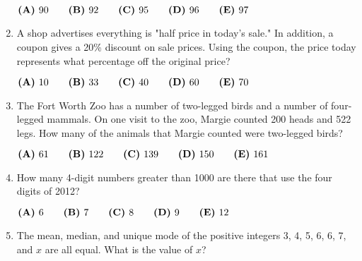 \documentclass{article}
\begin{document}
\begin{enumerate}[label=\arabic*., itemsep=0.5em]
\( \textbf{(A)}\hspace{.05in}90\qquad\textbf{(B)}\hspace{.05in}92\qquad\textbf{(C)}\hspace{.05in}95\qquad\textbf{(D)}\hspace{.05in}96\qquad\textbf{(E)}\hspace{.05in}97 \)\par \vspace{0.5em}\item A shop advertises everything is "half price in today's sale." In addition, a coupon gives a 20\% discount on sale prices. Using the coupon, the price today represents what percentage off the original price?

\( \textbf{(A)}\hspace{.05in}10\qquad\textbf{(B)}\hspace{.05in}33\qquad\textbf{(C)}\hspace{.05in}40\qquad\textbf{(D)}\hspace{.05in}60\qquad\textbf{(E)}\hspace{.05in}70 \)\par \vspace{0.5em}\item The Fort Worth Zoo has a number of two-legged birds and a number of four-legged mammals. On one visit to the zoo, Margie counted 200 heads and 522 legs. How many of the animals that Margie counted were two-legged birds?

\( \textbf{(A)}\hspace{.05in}61\qquad\textbf{(B)}\hspace{.05in}122\qquad\textbf{(C)}\hspace{.05in}139\qquad\textbf{(D)}\hspace{.05in}150\qquad\textbf{(E)}\hspace{.05in}161 \)\par \vspace{0.5em}\item How many 4-digit numbers greater than 1000 are there that use the four digits of 2012?

\( \textbf{(A)}\hspace{.05in}6\qquad\textbf{(B)}\hspace{.05in}7\qquad\textbf{(C)}\hspace{.05in}8\qquad\textbf{(D)}\hspace{.05in}9\qquad\textbf{(E)}\hspace{.05in}12 \)\par \vspace{0.5em}\item The mean, median, and unique mode of the positive integers 3, 4, 5, 6, 6, 7, and \(x\) are all equal. What is the value of \(x\)?


\end{enumerate}
\end{document}
